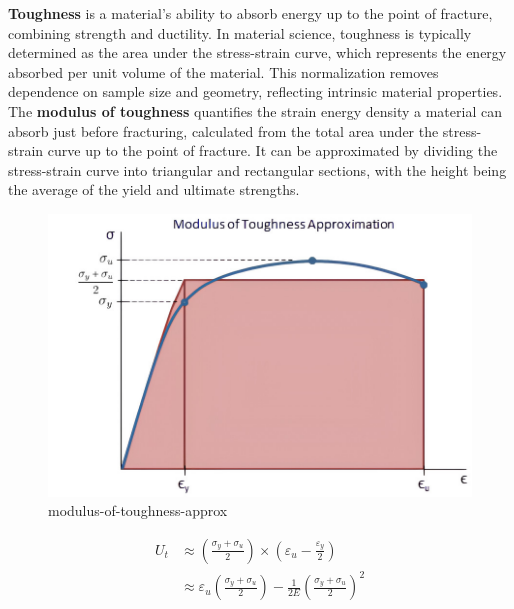 \documentclass{article}
\begin{document}
\textbf{Toughness} is a material's ability to absorb energy up to the point of fracture, combining strength and ductility. In material science, toughness is typically determined as the area under the {stress-strain curve}, which represents the energy absorbed per unit volume of the material. This normalization removes dependence on sample size and geometry, reflecting intrinsic material properties.\\[8pt]
The \textbf{modulus of toughness} quantifies the strain energy density a material can absorb just before fracturing, calculated from the total area under the stress-strain curve up to the point of fracture. It can be approximated by dividing the stress-strain curve into triangular and rectangular sections, with the height being the average of the yield and ultimate strengths.
\begin{center}
    \begin{minipage}{0.5\textwidth}\centering
        \begin{figure}[H]
            \centering
            \includegraphics[width=1\textwidth]{images/modulus-of-toughness-approx-01(1).jpg}
            \caption{modulus-of-toughness-approx}
            \label{fig:mot}
        \end{figure}
    \end{minipage}\hfil
    \begin{minipage}{0.45\textwidth}
        \begin{equation}
            \begin{aligned}
                U_t &\approx \left(\frac{\sigma_{y} + \sigma_{u}}{2}\right)\times\left(\varepsilon_u - \frac{\varepsilon_y}{2}\right)\\
                &\approx \varepsilon_u\left(\frac{\sigma_{y} + \sigma_{u}}{2}\right) -\frac{1}{2E}\left(\frac{\sigma_{y} + \sigma_{u}}{2}\right)^2

\end{aligned}
\end{equation}
\end{minipage}
\end{center}
\end{document}
